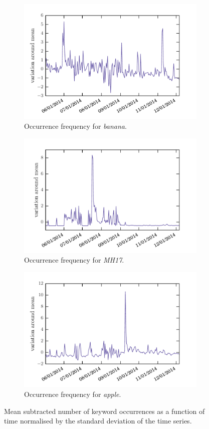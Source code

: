 \documentclass[12pt, a4paper]{article}
\begin{document}
\begin{figure}
\centering
\begin{subfigure}{.5\textwidth}
  \centering
  \includegraphics[width=.7\linewidth]{figs/banana.pdf}
  \caption{Occurrence frequency for \textit{banana}.}
  \label{fig:sub21}
\end{subfigure}%
\begin{subfigure}{.5\textwidth}
  \centering
  \includegraphics[width=.7\linewidth]{figs/mh17.pdf}
  \caption{Occurrence frequency for \textit{MH17}.}
  \label{fig:sub22}
\end{subfigure}
\begin{subfigure}{.5\textwidth}
  \centering
  \includegraphics[width=.7\linewidth]{figs/apple.pdf}
  \caption{Occurrence frequency for \textit{apple}.}
  \label{fig:sub23}
\end{subfigure}
\caption{Mean subtracted number of keyword occurrences as a function of time normalised by the standard deviation of the time series.}
\label{fig:timeseries_rel}
\end{figure}
\end{document}
